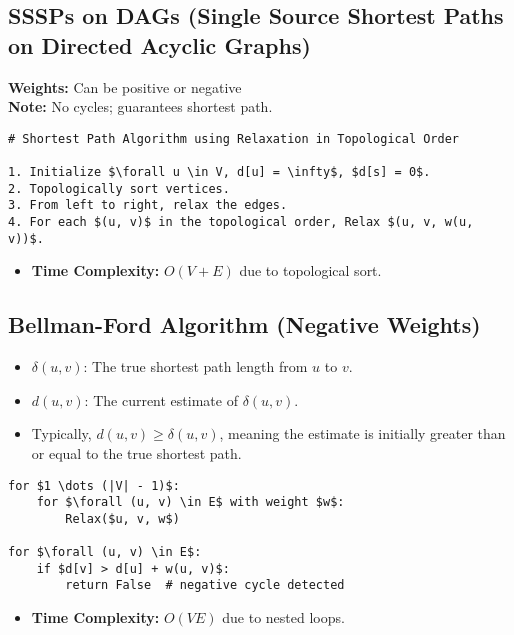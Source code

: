 \subsection{SSSPs on DAGs (Single Source Shortest Paths on Directed Acyclic Graphs)}
\begin{definition}
    \textbf{Weights:} Can be positive or negative \\
    \textbf{Note:} No cycles; guarantees shortest path.


\begin{lstlisting}[mathescape=true]
# Shortest Path Algorithm using Relaxation in Topological Order

1. Initialize $\forall u \in V, d[u] = \infty$, $d[s] = 0$.
2. Topologically sort vertices.
3. From left to right, relax the edges.
4. For each $(u, v)$ in the topological order, Relax $(u, v, w(u, v))$.
\end{lstlisting}
\begin{itemize}
    \item \textbf{Time Complexity:} \( O(V + E) \) due to topological sort.
\end{itemize}
\end{definition}

\subsection{Bellman-Ford Algorithm (Negative Weights)}
\begin{summary}
    \begin{itemize}
        \item \( \delta(u, v) \): The true shortest path length from \( u \) to \( v \).
        \item \( d(u, v) \): The current estimate of \( \delta(u, v) \).
        \item Typically, \( d(u, v) \geq \delta(u, v) \), meaning the estimate is initially greater than or equal to the true shortest path.
    \end{itemize}        
\end{summary}

\begin{definition}
\begin{lstlisting}[mathescape=true]
for $1 \dots (|V| - 1)$:
    for $\forall (u, v) \in E$ with weight $w$:
        Relax($u, v, w$)

for $\forall (u, v) \in E$:
    if $d[v] > d[u] + w(u, v)$:
        return False  # negative cycle detected
\end{lstlisting} 
\begin{itemize}
    \item \textbf{Time Complexity:} \( O(VE) \) due to nested loops.
\end{itemize}
\end{definition}

